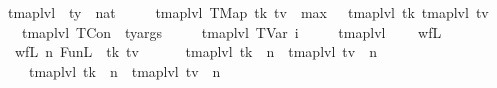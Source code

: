\begin{isabellebody}\isanewline
\isamarkupfalse%
\ tmap{\isacharunderscore}{\kern0pt}lvl\ {\isacharcolon}{\kern0pt}{\isacharcolon}{\kern0pt}\ {\isachardoublequoteopen}ty\ {\isasymRightarrow}\ nat{\isachardoublequoteclose}\ \isanewline
\ \ \ \ {\isachardoublequoteopen}tmap{\isacharunderscore}{\kern0pt}lvl\ {\isacharparenleft}{\kern0pt}TMap\ tk\ tv{\isacharparenright}{\kern0pt}\ {\isacharequal}{\kern0pt}\ max\ {\isacharparenleft}{\kern0pt}{}\ {\isacharplus}{\kern0pt}\ tmap{\isacharunderscore}{\kern0pt}lvl\ tk{\isacharparenright}{\kern0pt}\ {\isacharparenleft}{\kern0pt}tmap{\isacharunderscore}{\kern0pt}lvl\ tv{\isacharparenright}{\kern0pt}{\isachardoublequoteclose}\isanewline
\ \ {\isacharbar}{\kern0pt}\ {\isachardoublequoteopen}tmap{\isacharunderscore}{\kern0pt}lvl\ {\isacharparenleft}{\kern0pt}TCon\ {\isacharunderscore}{\kern0pt}\ ty{\isacharunderscore}{\kern0pt}args{\isacharparenright}{\kern0pt}\ {\isacharequal}{\kern0pt}\ {}{\isachardoublequoteclose}\isanewline
\ \ {\isacharbar}{\kern0pt}\ {\isachardoublequoteopen}tmap{\isacharunderscore}{\kern0pt}lvl\ {\isacharparenleft}{\kern0pt}TVar\ i{\isacharparenright}{\kern0pt}\ {\isacharequal}{\kern0pt}\ {}{\isachardoublequoteclose}\isanewline
\ \ {\isacharbar}{\kern0pt}\ {\isachardoublequoteopen}tmap{\isacharunderscore}{\kern0pt}lvl\ {\isacharunderscore}{\kern0pt}\ {\isacharequal}{\kern0pt}\ {}{\isachardoublequoteclose}
\isanewline\isanewline
\isamarkupfalse%
\ wf{\isacharunderscore}{\kern0pt}L\ \isanewline
\ \ {\isachardoublequoteopen}wf{\isacharunderscore}{\kern0pt}L\ n\ {\isacharparenleft}{\kern0pt}FunL\ {\isacharunderscore}{\kern0pt}\ tk\ tv{\isacharparenright}{\kern0pt}\ {\isacharequal}{\kern0pt}\ {\isacharparenleft}{\kern0pt}\isanewline
\ \ \ \ {\isacharparenleft}{\kern0pt}tmap{\isacharunderscore}{\kern0pt}lvl\ tk\ {\isasymle}\ n{\isacharminus}{\kern0pt}{}{\isacharparenright}{\kern0pt}\ {\isasymand}\ {\isacharparenleft}{\kern0pt}tmap{\isacharunderscore}{\kern0pt}lvl\ tv\ {\isasymle}\ n{\isacharparenright}{\kern0pt}\ {\isasymand}\isanewline
\ \ \ \ {\isacharparenleft}{\kern0pt}{\isacharparenleft}{\kern0pt}tmap{\isacharunderscore}{\kern0pt}lvl\ tk\ {\isacharequal}{\kern0pt}\ n{\isacharminus}{\kern0pt}{}{\isacharparenright}{\kern0pt}\ {\isasymor}\ {\isacharparenleft}{\kern0pt}tmap{\isacharunderscore}{\kern0pt}lvl\ tv\ {\isacharequal}{\kern0pt}\ n{\isacharparenright}{\kern0pt}{\isacharparenright}{\kern0pt}{\isacharparenright}{\kern0pt}{\isachardoublequoteclose}

\end{isabellebody}
